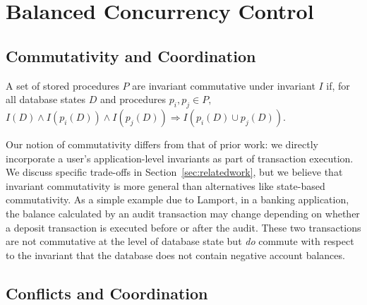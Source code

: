
\section{Balanced Concurrency Control}
\label{sec:bcc-theory}

\subsection{Commutativity and Coordination}

\begin{definition}
A set of stored procedures $P$ are invariant commutative under
invariant $I$ if, for all database states $D$ and procedures $p_i, p_j
\in P,$$ I(D) \wedge I(p_i(D)) \wedge I(p_j(D)) \Rightarrow I(p_i(D)
\cup p_j(D))$.
\end{definition}

 Our notion of
commutativity differs from that of prior work: we directly incorporate
a user's application-level invariants as part of transaction
execution. We discuss specific trade-offs in
Section~\ref{sec:relatedwork}, but we believe that invariant
commutativity is more general than alternatives like state-based
commutativity. As a simple example due to Lamport, in a banking
application, the balance calculated by an audit transaction may change
depending on whether a deposit transaction is executed before or after
the audit. These two transactions are not commutative at the level of
database state but \textit{do} commute with respect to the invariant
that the database does not contain negative account balances.

\subsection{Conflicts and Coordination}

\begin{theorem}

\end{theorem}
